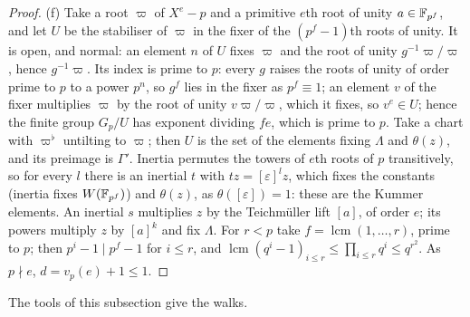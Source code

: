 \begin{proof}
(f) Take a root $\varpi$ of $X^e-p$ and a primitive $e$th root of unity $a\in\mathbb{F}_{p^f}$, and let $U$ be the stabiliser of $\varpi$ in the fixer of the $(p^f-1)$th roots of unity. It is open, and normal: an element $n$ of $U$ fixes $\varpi$ and the root of unity $g^{-1}\varpi/\varpi$, hence $g^{-1}\varpi$. Its index is prime to $p$: every $g$ raises the roots of unity of order prime to $p$ to a power $p^n$, so $g^f$ lies in the fixer as $p^f\equiv1$; an element $v$ of the fixer multiplies
$\varpi$ by the root of unity $v\varpi/\varpi$, which it fixes, so $v^e\in U$; hence the finite group $G_p/U$ has exponent dividing $fe$, which is prime to $p$. Take a chart with $\varpi^\flat$ untilting to $\varpi$; then $U$ is the set of the elements fixing $\Lambda$ and $\theta(z)$, and its preimage is $\Gamma'$. Inertia permutes the
towers of $e$th roots of $p$ transitively, so for every $l$ there is an inertial $t$ with $tz=[\varepsilon]^lz$, which fixes the constants (inertia fixes $W(\mathbb{F}_{p^f})$) and $\theta(z)$, as $\theta([\varepsilon])=1$: these are the Kummer elements. An inertial $s$ multiplies $z$ by the Teichm\"uller lift $[a]$, of order $e$; its powers
multiply $z$ by $[a]^k$ and fix $\Lambda$. For $r<p$ take $f=\operatorname{lcm}(1,\dots,r)$, prime to $p$; then $p^i-1\mid p^f-1$ for $i\le r$, and $\operatorname{lcm}(q^i-1)_{i\le r}\le\prod_{i\le r}q^i\le q^{r^2}$. As
$p\nmid e$, $d=v_p(e)+1\le1$.
\end{proof}

The tools of this subsection give the walks.


